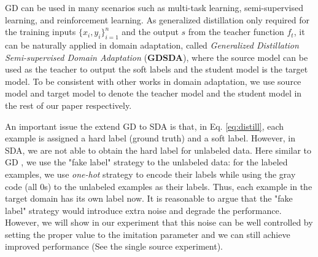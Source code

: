 GD can be used in many scenarios such as multi-task learning, semi-supervised learning, and reinforcement learning. As generalized distillation only required for the training inputs $\{x_i,y_i\}_{i=1}^n$ and the output $s$ from the teacher function $f_t$, it can be naturally applied in domain adaptation, called \textit{Generalized Distillation Semi-supervised Domain Adaptation} (\textbf{GDSDA}), where the source model can be used as the teacher to output the soft labels and the student model is the target model. To be consistent with other works in domain adaptation, we use source model and target model to denote the teacher model and the student model in the rest of our paper respectively.

An important issue the extend GD to SDA is that, in Eq. \eqref{eq:distill}, each example is assigned a hard label (ground truth) and a soft label. However, in SDA, we are not able to obtain the hard label for unlabeled data. Here similar to GD \cite{lopez2015unifying}, we use the "fake label" strategy to the unlabeled data: for the labeled examples, we use \textit{one-hot} strategy to encode their labels while using the gray code (all 0s) to the unlabeled examples as their labels. Thus, each example in the target domain has its own label now. It is reasonable to argue that the "fake label" strategy would introduce extra noise and degrade the performance. However, we will show in our experiment that this noise can be well controlled by setting the proper value to the imitation parameter and we can still achieve improved performance (See the single source experiment).

